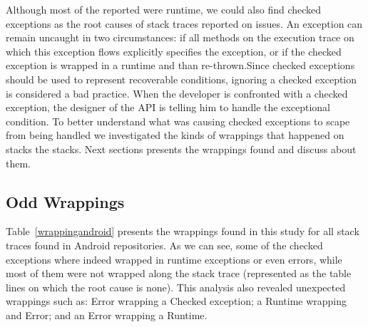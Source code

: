 \documentclass[conference]{IEEEtran}
\begin{document}
Although most of the reported were runtime, we could also find checked exceptions as the root causes of stack traces reported on issues. An exception can remain uncaught in two circumstances: if all methods on the execution trace on which this exception flows explicitly specifies the exception, or if the checked exception is wrapped in a runtime and than re-thrown.Since checked exceptions should be used to represent recoverable conditions, ignoring a checked exception is considered a bad practice. When the developer is confronted with a checked exception, the designer of the API is telling him to handle the exceptional condition. To better understand what was causing checked exceptions to scape from being handled we investigated the kinds of wrappings that happened on stacks the stacks.  Next sections presents the wrappings found and discuss about them.

\subsection{Odd Wrappings}

 Table~\ref{wrappingandroid} presents the wrappings found in this study for all stack traces found in Android repositories. As we can see, some of the checked exceptions where indeed wrapped in runtime exceptions or even errors, while most of them were not wrapped along the stack trace (represented as the table lines on which the root cause is none). This analysis also revealed unexpected wrappings such as: Error wrapping a Checked exception; a Runtime wrapping and Error; and an Error wrapping a Runtime.
\end{document}

